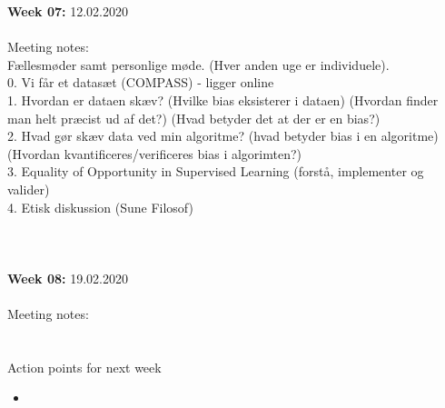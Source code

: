 \documentclass[11pt, fleqn]{article}
\begin{document}
	\textbf{Week 07:}  12.02.2020 \\\\
	\noindent
	Meeting notes: \\ Fællesmøder samt personlige møde. (Hver anden uge er individuele). \\0. Vi får et datasæt (COMPASS) - ligger online \\
	1. Hvordan er dataen skæv? (Hvilke bias eksisterer i dataen) (Hvordan finder man helt præcist ud af det?) (Hvad betyder det at der er en bias?) \\
	2. Hvad gør skæv data ved min algoritme? (hvad betyder bias i en algoritme) (Hvordan kvantificeres/verificeres bias i algorimten?) \\
	3. Equality of Opportunity in Supervised Learning (forstå, implementer og valider) \\ 
	4. Etisk diskussion (Sune Filosof)
	\\\\\\\\
	\textbf{Week 08:}  19.02.2020 \\\\
	\noindent
	Meeting notes: \\ 
	\\\\
	Action points for next week
	\begin{itemize}
		\item  
	\end{itemize}
	
	
		
	
\end{document}
